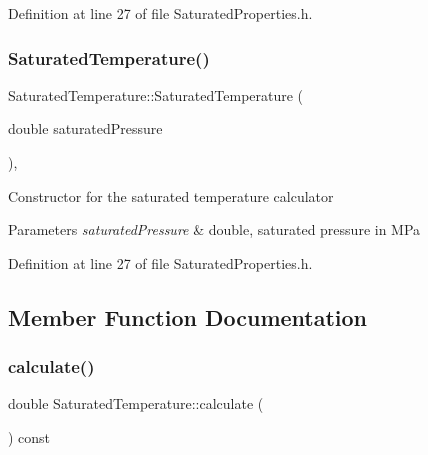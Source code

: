 Definition at line 27 of file Saturated\+Properties.\+h.

\mbox{\label{class_saturated_temperature_ae0a4b1684a756ac8f91d3ebb646d6865}} 
\subsubsection{\texorpdfstring{Saturated\+Temperature()}{SaturatedTemperature()}\hspace{0.1cm}{\footnotesize\ttfamily [3/3]}}
{\footnotesize\ttfamily Saturated\+Temperature\+::\+Saturated\+Temperature (\begin{DoxyParamCaption}\item[{double}]{saturated\+Pressure }\end{DoxyParamCaption})\hspace{0.3cm}{\ttfamily [inline]}, {\ttfamily [explicit]}}

Constructor for the saturated temperature calculator 
\begin{DoxyParams}{Parameters}
{\em saturated\+Pressure} & double, saturated pressure in M\+Pa \\
\hline
\end{DoxyParams}


Definition at line 27 of file Saturated\+Properties.\+h.



\subsection{Member Function Documentation}
\mbox{\label{class_saturated_temperature_a4aa0d2a337289dd36f4e063f1f67aaa5}} 
\subsubsection{\texorpdfstring{calculate()}{calculate()}\hspace{0.1cm}{\footnotesize\ttfamily [1/3]}}
{\footnotesize\ttfamily double Saturated\+Temperature\+::calculate (\begin{DoxyParamCaption}{ }\end{DoxyParamCaption}) const}

